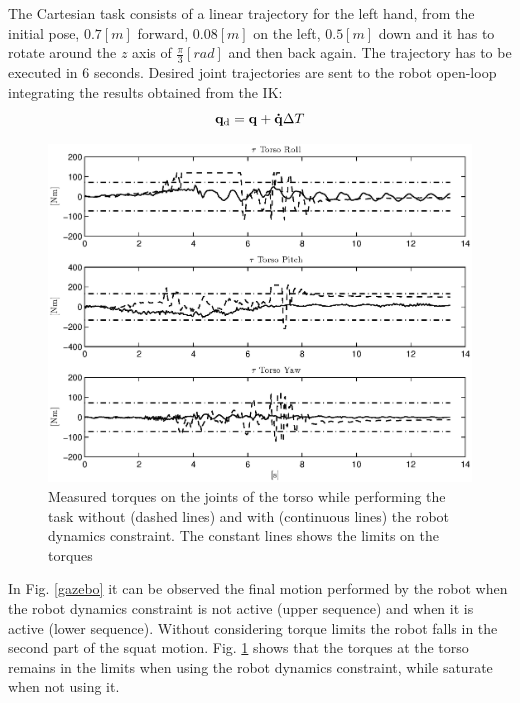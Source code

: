 The Cartesian task consists of a linear trajectory for the left hand, from the initial pose, $0.7 \left[ m \right]$ forward, $0.08 \left[ m \right]$ on the left, $0.5 \left[ m \right]$ down and it has to rotate around the $z$ axis of $\frac{\pi}{3} \left[ rad \right]$ and then back again. The trajectory has to be executed in 6 seconds. Desired joint trajectories are sent to the robot open-loop integrating the results obtained from the IK:
\begin{equation}
\mathbf{q}_\text{d} = \mathbf{q} + \mathbf{\dot{q}} \Delta T
\end{equation}

\begin{figure}[htb] 
\centering 
\includegraphics[width=\textwidth]{images/tau_torso.eps} 
\caption{Measured torques on the joints of the torso while performing the task without (dashed lines) and with (continuous lines) the robot dynamics constraint. The constant lines shows the limits on the torques} 
\label{tau_torso}
\end{figure}

In Fig. \ref{gazebo} it can be observed the final motion performed by the robot when the robot dynamics constraint is not active (upper sequence) and when it is active (lower sequence). Without considering torque limits the robot falls in the second part of the squat motion. Fig. \ref{tau_torso} shows that the torques at the torso remains in the limits when using the robot dynamics constraint, while saturate when not using it.


